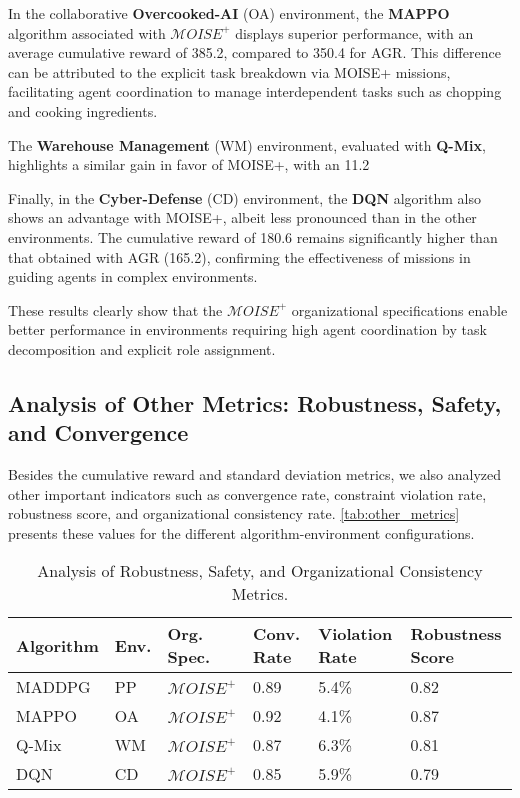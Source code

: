\documentclass[sigconf,anonymous]{aamas}
\begin{document}
In the collaborative \textbf{Overcooked-AI} (OA) environment, the \textbf{MAPPO} algorithm associated with $\mathcal{M}OISE^+$ displays superior performance, with an average cumulative reward of 385.2, compared to 350.4 for AGR. This difference can be attributed to the explicit task breakdown via MOISE+ missions, facilitating agent coordination to manage interdependent tasks such as chopping and cooking ingredients.

The \textbf{Warehouse Management} (WM) environment, evaluated with \textbf{Q-Mix}, highlights a similar gain in favor of MOISE+, with an 11.2%

Finally, in the \textbf{Cyber-Defense} (CD) environment, the \textbf{DQN} algorithm also shows an advantage with MOISE+, albeit less pronounced than in the other environments. The cumulative reward of 180.6 remains significantly higher than that obtained with AGR (165.2), confirming the effectiveness of missions in guiding agents in complex environments.

These results clearly show that the $\mathcal{M}OISE^+$ organizational specifications enable better performance in environments requiring high agent coordination by task decomposition and explicit role assignment.

\subsection{Analysis of Other Metrics: Robustness, Safety, and Convergence}

Besides the cumulative reward and standard deviation metrics, we also analyzed other important indicators such as convergence rate, constraint violation rate, robustness score, and organizational consistency rate. \autoref{tab:other_metrics} presents these values for the different algorithm-environment configurations.

\begin{table}[h!]
    \centering
    \caption{Analysis of Robustness, Safety, and Organizational Consistency Metrics.}
    \label{tab:other_metrics}
    \small %
    \renewcommand{\arraystretch}{1.1}
    \begin{tabular}{p{1.2cm}p{0.5cm}p{1.1cm}p{0.5cm}p{1.4cm}p{1.4cm}}
        \hline
        \textbf{Algorithm} & \textbf{Env.} & \textbf{Org. Spec.} & \textbf{Conv. Rate} & \textbf{Violation Rate} & \textbf{Robustness Score} \\ \hline
        MADDPG & PP & $\mathcal{M}OISE^+$ & 0.89 & 5.4\% & 0.82 \\
        MAPPO & OA & $\mathcal{M}OISE^+$ & 0.92 & 4.1\% & 0.87 \\
        Q-Mix & WM & $\mathcal{M}OISE^+$ & 0.87 & 6.3\% & 0.81 \\
        DQN & CD & $\mathcal{M}OISE^+$ & 0.85 & 5.9\% & 0.79 \\
    \end{tabular}
\end{table}
\end{document}
